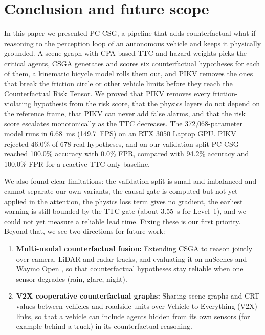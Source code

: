 \documentclass[preprint,12pt]{elsarticle}
\begin{document}
\section{Conclusion and future scope} \label{section5}
In this paper we presented PC-CSG, a pipeline that adds counterfactual what-if reasoning to the perception loop of an autonomous vehicle and keeps it physically grounded. A scene graph with CPA-based TTC and hazard weights picks the critical agents, CSGA generates and scores six counterfactual hypotheses for each of them, a kinematic bicycle model rolls them out, and PIKV removes the ones that break the friction circle or other vehicle limits before they reach the Counterfactual Risk Tensor. We proved that PIKV removes every friction-violating hypothesis from the risk score, that the physics layers do not depend on the reference frame, that PIKV can never add false alarms, and that the risk score escalates monotonically as the TTC decreases. The 372,068-parameter model runs in 6.68~ms (149.7~FPS) on an RTX 3050 Laptop GPU. PIKV rejected 46.0\% of 678 real hypotheses, and on our validation split PC-CSG reached 100.0\% accuracy with 0.0\% FPR, compared with 94.2\% accuracy and 100.0\% FPR for a reactive TTC-only baseline.

We also found clear limitations: the validation split is small and imbalanced and cannot separate our own variants, the causal gate is computed but not yet applied in the attention, the physics loss term gives no gradient, the earliest warning is still bounded by the TTC gate (about 3.55~s for Level~1), and we could not yet measure a reliable lead time. Fixing these is our first priority. Beyond that, we see two directions for future work:
\begin{enumerate}
    \item \textbf{Multi-modal counterfactual fusion:} Extending CSGA to reason jointly over camera, LiDAR and radar tracks, and evaluating it on nuScenes \cite{caesar2020nuscenes} and Waymo Open \cite{sun2020waymo}, so that counterfactual hypotheses stay reliable when one sensor degrades (rain, glare, night).
    \item \textbf{V2X cooperative counterfactual graphs:} Sharing scene graphs and CRT values between vehicles and roadside units over Vehicle-to-Everything (V2X) links, so that a vehicle can include agents hidden from its own sensors (for example behind a truck) in its counterfactual reasoning.
\end{enumerate}


\end{document}
